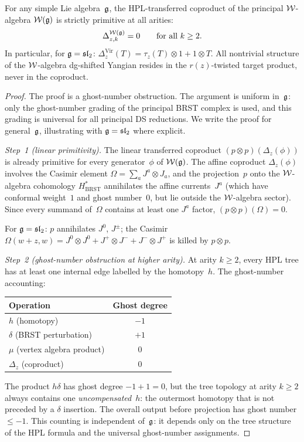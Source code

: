 \begin{theorem}
\label{thm:grav-primitivity-standalone}
For any simple Lie algebra~$\mathfrak{g}$, the HPL-transferred coproduct
of the principal $\mathcal{W}$-algebra $\mathcal{W}(\mathfrak{g})$ is strictly primitive
at all arities:
\begin{equation}\label{eq:grav-prim}
\Delta_{z,k}^{\mathcal{W}(\mathfrak{g})} = 0
\qquad \text{for all } k \geq 2.
\end{equation}
In particular, for $\mathfrak{g} = \mathfrak{sl}_2$:
$\Delta_z^{\mathrm{Vir}}(T) = \tau_z(T) \otimes 1
+ 1 \otimes T$. All nontrivial structure of the $\mathcal{W}$-algebra
dg-shifted Yangian resides in the $r(z)$-twisted target product,
never in the coproduct.
\end{theorem}

\begin{proof}
The proof is a ghost-number obstruction. The argument is
uniform in~$\mathfrak{g}$: only the ghost-number grading of the
principal BRST complex is used, and this grading is universal
for all principal DS reductions. We write the proof for
general~$\mathfrak{g}$, illustrating with
$\mathfrak{g} = \mathfrak{sl}_2$ where explicit.

\emph{Step~1 (linear primitivity).}
The linear transferred coproduct
$(p \otimes p)(\Delta_z(\phi))$ is already primitive for
every generator~$\phi$ of $\mathcal{W}(\mathfrak{g})$. The affine coproduct
$\Delta_z(\phi)$ involves the Casimir element
$\Omega = \sum_a J^a \otimes J_a$, and the projection~$p$
onto the $\mathcal{W}$-algebra cohomology $H^*_{\mathrm{BRST}}$
annihilates the affine currents~$J^a$ (which have conformal
weight~$1$ and ghost number~$0$, but lie outside the
$\mathcal{W}$-algebra sector). Since every summand of~$\Omega$
contains at least one $J^a$ factor, $(p \otimes p)(\Omega) = 0$.

For $\mathfrak{g} = \mathfrak{sl}_2$: $p$ annihilates $J^0$, $J^\pm$;
the Casimir $\Omega(w{+}z,w) = J^0 \otimes J^0
+ J^+ \otimes J^- + J^- \otimes J^+$ is killed by
$p \otimes p$.

\emph{Step~2 (ghost-number obstruction at higher arity).}
At arity $k \geq 2$, every HPL tree has at least one internal
edge labelled by the homotopy~$h$. The ghost-number accounting:
\begin{center}
\small
\begin{tabular}{lc}
Operation & Ghost degree \\
\hline
$h$ (homotopy) & $-1$ \\
$\delta$ (BRST perturbation) & $+1$ \\
$\mu$ (vertex algebra product) & $0$ \\
$\Delta_z$ (coproduct) & $0$ \\
\end{tabular}
\end{center}
The product $h\delta$ has ghost degree $-1 + 1 = 0$, but the
tree topology at arity $k \geq 2$ always contains one
\emph{uncompensated}~$h$: the outermost homotopy that is not
preceded by a $\delta$ insertion. The overall output before
projection has ghost number $\leq -1$. This counting is
independent of~$\mathfrak{g}$: it depends only on the tree
structure of the HPL formula and the universal ghost-number
assignments.


\end{proof}

